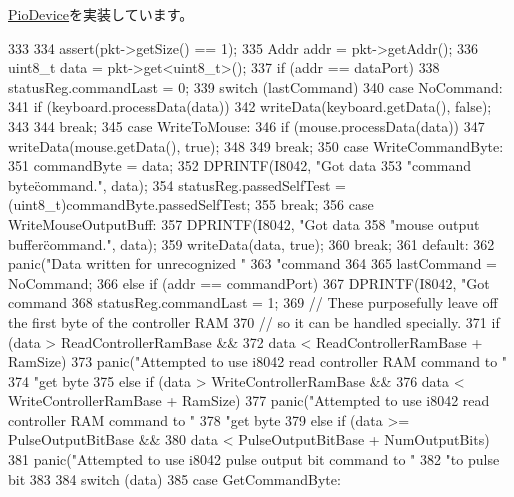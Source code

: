 \hyperlink{classPioDevice_afe8371668d023bb2516b286e5e399b6f}{PioDevice}を実装しています。


\begin{DoxyCode}
333 {
334     assert(pkt->getSize() == 1);
335     Addr addr = pkt->getAddr();
336     uint8_t data = pkt->get<uint8_t>();
337     if (addr == dataPort) {
338         statusReg.commandLast = 0;
339         switch (lastCommand) {
340           case NoCommand:
341             if (keyboard.processData(data)) {
342                 writeData(keyboard.getData(), false);
343             }
344             break;
345           case WriteToMouse:
346             if (mouse.processData(data)) {
347                 writeData(mouse.getData(), true);
348             }
349             break;
350           case WriteCommandByte:
351             commandByte = data;
352             DPRINTF(I8042, "Got data %
353                     "command byte\" command.\n", data);
354             statusReg.passedSelfTest = (uint8_t)commandByte.passedSelfTest;
355             break;
356           case WriteMouseOutputBuff:
357             DPRINTF(I8042, "Got data %
358                     "mouse output buffer\" command.\n", data);
359             writeData(data, true);
360             break;
361           default:
362             panic("Data written for unrecognized "
363                     "command %
364         }
365         lastCommand = NoCommand;
366     } else if (addr == commandPort) {
367         DPRINTF(I8042, "Got command %
368         statusReg.commandLast = 1;
369         // These purposefully leave off the first byte of the controller RAM
370         // so it can be handled specially.
371         if (data > ReadControllerRamBase &&
372                 data < ReadControllerRamBase + RamSize) {
373             panic("Attempted to use i8042 read controller RAM command to "
374                     "get byte %
375         } else if (data > WriteControllerRamBase &&
376                 data < WriteControllerRamBase + RamSize) {
377             panic("Attempted to use i8042 read controller RAM command to "
378                     "get byte %
379         } else if (data >= PulseOutputBitBase &&
380                 data < PulseOutputBitBase + NumOutputBits) {
381             panic("Attempted to use i8042 pulse output bit command to "
382                     "to pulse bit %
383         }
384         switch (data) {
385           case GetCommandByte:
}}}
\end{DoxyCode}
